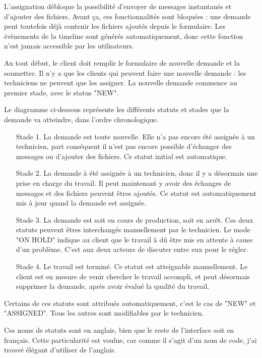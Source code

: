 \documentclass[
    iai, %
    eai, %
]{heig-tb}
\begin{document}
L'assignation débloque la possibilité d'envoyer de messages instantanés et d'ajouter des fichiers.
Avant ça, ces fonctionnalités sont bloquées : une demande peut toutefois déjà contenir les fichiers ajoutés depuis le formulaire.
Les évènements de la timeline sont générés automatiquement, donc cette fonction n'est jamais accessible par les utilisateurs.

Au tout début, le client doit remplir le formulaire de nouvelle demande et la soumettre.
Il n'y a que les clients qui peuvent faire une nouvelle demande : les techniciens ne peuvent que les assigner.
La nouvelle demande commence au premier stade, avec le status "NEW".
\newpage

Le diagramme ci-dessous représente les différents statuts et stades que la demande va atteindre, dans l'ordre chronologique.


\begin{enumerate}
  \item[Stade 1.] La demande est toute nouvelle. Elle n'a pas encore été assignée à un technicien, part conséquent il n'est pas encore possible d'échanger des messages ou d'ajouter des fichiers. Ce statut initial est automatique.
  \item[Stade 2.] La demande à été assignée à un technicien, donc il y a désormais une prise en charge du travail. Il peut maintenant y avoir des échanges de messages et des fichiers peuvent êtres ajoutés. Ce statut est automatiquement mis à jour quand la demande est assignée.
  \item[Stade 3.] La demande est soit en cours de production, soit en arrêt. Ces deux statuts peuvent êtres interchangés manuellement par le technicien. Le mode "ON HOLD" indique au client que le travail à dû être mis en attente à cause d'un problème. C'est aux deux acteurs de discuter entre eux pour le régler.
  \item[Stade 4.] Le travail est terminé. Ce statut est atteignable manuellement. Le client est en mesure de venir chercher le travail accompli, et peut désormais supprimer la demande, après avoir évalué la qualité du travail.
\end{enumerate}
\bigskip
Certains de ces statuts sont attribués automatiquement, c'est le cas de "NEW" et "ASSIGNED".
Tous les autres sont modifiables par le technicien.

Ces noms de statuts sont en anglais, bien que le reste de l'interface soit en français.
Cette particularité est voulue, car comme il s'agit d'un nom de code, j'ai trouvé élégant d'utiliser de l'anglais.
\end{document}
